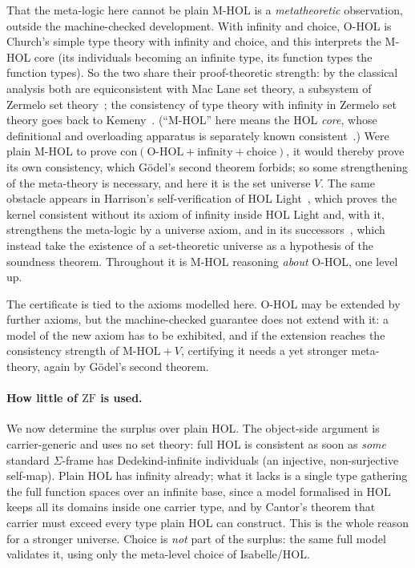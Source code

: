 \documentclass[11pt,a4paper]{article}
\begin{document}
That the meta-logic here cannot be plain M-HOL is a \emph{metatheoretic}
observation, outside the machine-checked development.  With infinity and
choice, O-HOL is Church's simple type theory with infinity and choice,
and this interprets the M-HOL core (its individuals becoming an infinite
type, its function types the function types).  So the two share their
proof-theoretic strength: by the classical analysis both are
equiconsistent with Mac Lane set theory, a subsystem of Zermelo set
theory~\cite{Mathias01}; the consistency of type theory with infinity in
Zermelo set theory goes back to Kemeny~\cite{Kemeny49}.  (``M-HOL'' here
means the HOL \emph{core}, whose definitional and overloading apparatus
is separately known consistent~\cite{KuncarPopescu19}.)  Were plain M-HOL
to prove $\mathrm{con}(\text{O-HOL}+\text{infinity}+\text{choice})$, it
would thereby prove its own consistency, which G\"odel's second theorem
forbids; so some strengthening of the meta-theory is necessary, and here
it is the set universe $V$.  The same obstacle appears in Harrison's
self-verification of HOL Light~\cite{Harrison06}, which proves the kernel
consistent without its axiom of infinity inside HOL Light and, with it,
strengthens the meta-logic by a universe axiom, and in its successors~\cite{Kumar16},
which instead take the existence of a set-theoretic universe as a
hypothesis of the soundness theorem.  Throughout it is M-HOL reasoning
\emph{about} O-HOL, one level up.

The certificate is tied to the axioms modelled here.  O-HOL may be
extended by further axioms, but the machine-checked guarantee does not
extend with it: a model of the new axiom has to be exhibited, and if the
extension reaches the consistency strength of $\text{M-HOL}+V$,
certifying it needs a yet stronger meta-theory, again by G\"odel's
second theorem.

\paragraph{How little of $\mathrm{ZF}$ is used.}
We now determine the surplus over plain HOL.  The object-side argument is
carrier-generic and uses no set theory: full HOL is consistent as soon as
\emph{some} standard $\Sigma$-frame has Dedekind-infinite individuals (an
injective, non-surjective self-map).  Plain HOL has infinity already; what
it lacks is a single type gathering the full function spaces over an
infinite base, since a model formalised in HOL keeps all its domains inside
one carrier type, and by Cantor's theorem that carrier must exceed every
type plain HOL can construct.  This is the whole reason for a stronger
universe.  Choice is \emph{not} part of the surplus: the same full model
validates it, using only the meta-level choice of Isabelle/HOL.
\end{document}
